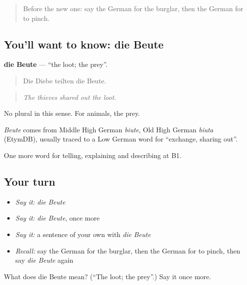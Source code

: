 \label{lesson:GE-C281-beute}



\begin{quote}
Before the new one: say the German for the burglar, then the German for to pinch.
\end{quote}

\subsection*{You'll want to know: die Beute}
\textbf{die Beute} — \textquotedblleft{}the loot; the prey\textquotedblright{}.

\begin{quote}
Die Diebe teilten die Beute.
\end{quote}

\begin{quote}
\emph{The thieves shared out the loot.}
\end{quote}

No plural in this sense. For animals, the prey.

\begin{cousinweb}
\emph{Beute} comes from Middle High German \emph{biute}, Old High German \emph{biuta} (EtymDB), usually traced to a Low German word for \textquotedblleft{}exchange, sharing out\textquotedblright{}.
\end{cousinweb}

\begin{grammarlens}[title={What you've built}]
One more word for telling, explaining and describing at B1.
\end{grammarlens}

\subsection*{Your turn}
\begin{itemize}
\raggedright
  \item \emph{Say it:} \emph{die Beute}
  \item \emph{Say it:} \emph{die Beute}, once more
  \item \emph{Say it:} a sentence of your own with \emph{die Beute}
  \item \emph{Recall:} say the German for the burglar, then the German for to pinch, then say \emph{die Beute} again
\end{itemize}

\begin{tcolorbox}[breakable,colback=teal!4,colframe=teal!35!black,title={Before you move on}]
What does die Beute mean? (\textquotedblleft{}The loot; the prey\textquotedblright{}.) Say it once more.
\end{tcolorbox}
